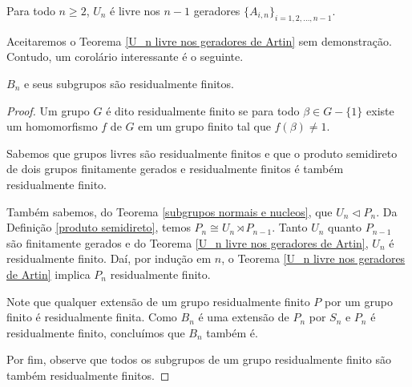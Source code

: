 	\begin{theorem}
		\label{U_n livre nos geradores de Artin}
		Para todo $n\geq 2$, $U_n$ é livre nos $n-1$ geradores $\{ A_{i,n} \}_{i=1,2,\dots,n-1}$.
	\end{theorem}
	
	\par\vspace{0.3cm} Aceitaremos o Teorema \eqref{U_n livre nos geradores de Artin} sem demonstração. Contudo, um corolário interessante é o seguinte.
	
	\begin{corollary}
		\label{B_n residualmente finito}
		$B_n$ e seus subgrupos são residualmente finitos.
	\end{corollary}
	
	\begin{proof}
		Um grupo $G$ é dito residualmente finito se para todo $\beta\in G-\{1\}$ existe um homomorfismo $f$ de $G$ em um grupo finito tal que $f(\beta)\neq 1$.
		\par\vspace{0.3cm} Sabemos que grupos livres são residualmente finitos e que o produto semidireto de dois grupos finitamente gerados e residualmente finitos é também residualmente finito.
		\par\vspace{0.3cm} Também sabemos, do Teorema \eqref{subgrupos normais e nucleos}, que $U_n\vartriangleleft P_n$. Da Definição \eqref{produto semidireto}, temos $P_n\cong U_n\rtimes P_{n-1}$. Tanto $U_n$ quanto $P_{n-1}$ são finitamente gerados e do Teorema \eqref{U_n livre nos geradores de Artin}, $U_n$ é residualmente finito. Daí, por indução em $n$, o Teorema \eqref{U_n livre nos geradores de Artin} implica $P_n$ residualmente finito.
		\par\vspace{0.3cm} Note que qualquer extensão de um grupo residualmente finito $P$ por um grupo finito é residualmente finita. Como $B_n$ é uma extensão de $P_n$ por $S_n$ e $P_n$ é residualmente finito, concluímos que $B_n$ também é.
		\par\vspace{0.3cm} Por fim, observe que todos os subgrupos de um grupo residualmente finito são também residualmente finitos.	
	\end{proof}
